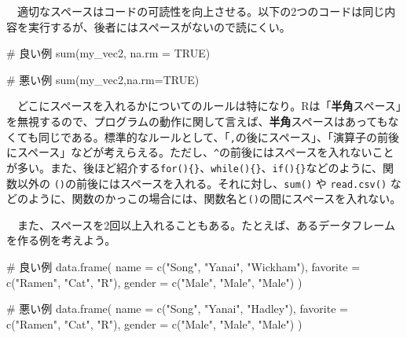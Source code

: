 \documentclass[
  a4paper,
  pandoc,
  ja=standard,
  jafont=haranoaji]{bxjsbook}
\newenvironment{Shaded}{\begin{snugshade}}{\end{snugshade}}
\newcommand{\AttributeTok}[1]{\textcolor[rgb]{0.00,0.48,0.65}{#1}}
\newcommand{\CommentTok}[1]{\textcolor[rgb]{0.37,0.37,0.37}{#1}}
\newcommand{\ConstantTok}[1]{\textcolor[rgb]{0.56,0.35,0.01}{#1}}
\newcommand{\FunctionTok}[1]{\textcolor[rgb]{0.28,0.35,0.67}{#1}}
\newcommand{\NormalTok}[1]{\textcolor[rgb]{0.00,0.48,0.65}{#1}}
\newcommand{\StringTok}[1]{\textcolor[rgb]{0.13,0.47,0.30}{#1}}
\begin{document}
　適切なスペースはコードの可読性を向上させる。以下の2つのコードは同じ内容を実行するが、後者にはスペースがないので読にくい。

\begin{Shaded}
\begin{Highlighting}[numbers=left,,]
\CommentTok{\# 良い例}
\FunctionTok{sum}\NormalTok{(my\_vec2, }\AttributeTok{na.rm =} \ConstantTok{TRUE}\NormalTok{)}

\CommentTok{\# 悪い例}
\FunctionTok{sum}\NormalTok{(my\_vec2,}\AttributeTok{na.rm=}\ConstantTok{TRUE}\NormalTok{)}
\end{Highlighting}
\end{Shaded}

　どこにスペースを入れるかについてのルールは特になり。Rは「\textbf{半角}スペース」を無視するので、プログラムの動作に関して言えば、\textbf{半角}スペースはあってもなくても同じである。標準的なルールとして、「\texttt{,}の後にスペース」、「演算子の前後にスペース」などが考えらえる。ただし、\texttt{\^{}}の前後にはスペースを入れないことが多い。また、後ほど紹介する\texttt{for()\{\}}、\texttt{while()\{\}}、\texttt{if()\{\}}などのように、関数以外の
\texttt{()}の前後にはスペースを入れる。それに対し、\texttt{sum()} や
\texttt{read.csv()}
などのように、関数のかっこの場合には、関数名と\texttt{()}の間にスペースを入れない。

　また、スペースを2回以上入れることもある。たとえば、あるデータフレームを作る例を考えよう。

\begin{Shaded}
\begin{Highlighting}[numbers=left,,]
\CommentTok{\# 良い例}
\FunctionTok{data.frame}\NormalTok{(}
  \AttributeTok{name     =} \FunctionTok{c}\NormalTok{(}\StringTok{"Song"}\NormalTok{,  }\StringTok{"Yanai"}\NormalTok{, }\StringTok{"Wickham"}\NormalTok{),}
  \AttributeTok{favorite =} \FunctionTok{c}\NormalTok{(}\StringTok{"Ramen"}\NormalTok{, }\StringTok{"Cat"}\NormalTok{,   }\StringTok{"R"}\NormalTok{),}
  \AttributeTok{gender   =} \FunctionTok{c}\NormalTok{(}\StringTok{"Male"}\NormalTok{,  }\StringTok{"Male"}\NormalTok{,  }\StringTok{"Male"}\NormalTok{)}
\NormalTok{)}

\CommentTok{\# 悪い例}
\FunctionTok{data.frame}\NormalTok{(}
  \AttributeTok{name =} \FunctionTok{c}\NormalTok{(}\StringTok{"Song"}\NormalTok{, }\StringTok{"Yanai"}\NormalTok{, }\StringTok{"Hadley"}\NormalTok{),}
  \AttributeTok{favorite =} \FunctionTok{c}\NormalTok{(}\StringTok{"Ramen"}\NormalTok{, }\StringTok{"Cat"}\NormalTok{, }\StringTok{"R"}\NormalTok{),}
  \AttributeTok{gender =} \FunctionTok{c}\NormalTok{(}\StringTok{"Male"}\NormalTok{, }\StringTok{"Male"}\NormalTok{, }\StringTok{"Male"}\NormalTok{)}
\NormalTok{)}
\end{Highlighting}
\end{Shaded}
\end{document}
